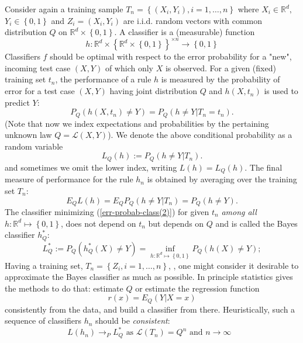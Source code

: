 \documentclass[11pt,twoside]{article}%
\theoremstyle{change}
\begin{document}
Consider again a training sample $T_{n}=\left\{  (X_{i},Y_{i}),i=1,\ldots
,n\right\}  $ where $X_{i}\in\mathbb{R}^{d},$ $Y_{i}\in\left\{  0,1\right\}  $
and $Z_{i}=(X_{i},Y_{i})$ are i.i.d. random vectors with common distribution
$Q$ on $\mathbb{R}^{d}\times\left\{  0,1\right\}  $. A classifier is a
(measurable) function%
\[
h:\mathbb{R}^{d}\times\left\{  \mathbb{R}^{d}\times\left\{  0,1\right\}
\right\}  ^{\times n}\rightarrow\left\{  0,1\right\}
\]
Classifiers $f$ should be optimal with respect to the error probability for a
"new", incoming test case $\left(  X,Y\right)  $ of which only $X$ is
observed. For a given (fixed) training set $t_{n}$, the performance of a rule
$h$ is measured by the probability of error for a test case $(X,Y)$ having
joint distribution $Q$ and $h(X,t_{n})$ is used to predict $Y:$
\begin{equation}
P_{Q}\left(  h(X,t_{n})\neq Y\right)  =P_{Q}\left(  h\neq Y|T_{n}%
=t_{n}\right)  .\label{err-probab-class(2)}%
\end{equation}
(Note that now we index expectations and probabilities by the pertaining
unknown law $Q=\mathcal{L}(X,Y)$). We denote the above conditional probability
as a random variable
\[
L_{Q}(h):=P_{Q}\left(  h\neq Y|T_{n}\right)  .
\]
and sometimes we omit the lower index, writing $L(h)=L_{Q}(h)$. The final
measure of performance for the rule $h_{n}$ is obtained by averaging over the
training set $T_{n}$:%
\begin{equation}
E_{Q}L(h)=E_{Q}P_{Q}\left(  h\neq Y|T_{n}\right)  =P_{Q}\left(  h\neq
Y\right)  .
\end{equation}
The classifier minimizing (\ref{err-probab-class(2)}) for given $t_{n}$
\textit{among all }$h:\mathbb{R}^{d}\mapsto\left\{  0,1\right\}  $, does not
depend on $t_{n}$ but depends on $Q$ and is called the Bayes classifier
$h_{Q}^{\ast}$:%
\[
L_{Q}^{\ast}:=P_{Q}\left(  h_{Q}^{\ast}(X)\neq Y\right)  =\inf_{h:\mathbb{R}%
^{d}\mapsto\left\{  0,1\right\}  }P_{Q}\left(  h(X)\neq Y\right)  ;
\]
Having a training set, $T_{n}=\left\{  Z_{i},i=1,\ldots,n\right\}  $, , one
might consider it desirable to approximate the Bayes classifier as much as
possible. In principle statistics gives the methods to do that: estimate $Q$
or estimate the regression function
\[
r(x)=E_{Q}\left(  Y|X=x\right)
\]
consistently from the data, and build a classifier from there. Heuristically,
such a sequence of classifiers $h_{n}$ should be \textit{consistent}:
\begin{equation}
L(h_{n})\rightarrow_{P}L_{Q}^{\ast}\text{ as }\mathcal{L}\left(  T_{n}\right)
=Q^{n}\text{ and }n\rightarrow\infty\text{ }\label{univ-consist}%
\end{equation}
\end{document}
